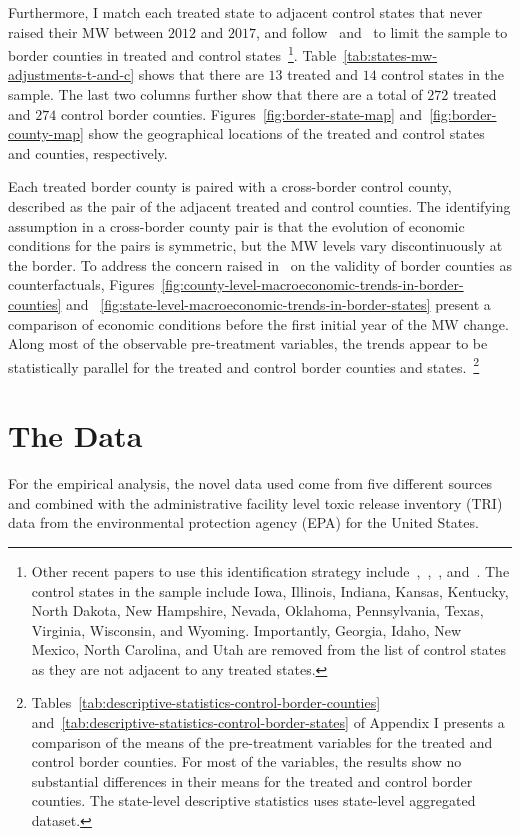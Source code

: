 \documentclass[12pt, english]{article}
\begin{document}
    Furthermore, I match each treated state to adjacent control states that never raised their MW between $2012$ and $2017$, and follow~\cite{dube2010minimum} and~\cite{gopalan2021state} to limit the sample to border counties in treated and control states~\footnote{\tiny Other recent papers to use this identification strategy include~\cite{aaronson2018industry},~\cite{dube2019fairness},~\cite{jardim2018minimum}, and~\cite{zhang2019distributional}. The control states in the sample include Iowa, Illinois, Indiana, Kansas, Kentucky, North Dakota, New Hampshire, Nevada, Oklahoma, Pennsylvania, Texas, Virginia, Wisconsin, and Wyoming. Importantly, Georgia, Idaho, New Mexico, North Carolina, and Utah are removed from the list of control states as they are not adjacent to any treated states.}. Table~\ref{tab:states-mw-adjustments-t-and-c} shows that there are $13$ treated and $14$ control states in the sample. The last two columns further show that there are a total of $272$ treated and $274$ control border counties. Figures~\ref{fig:border-state-map} and~\ref{fig:border-county-map} show the geographical locations of the treated and control states and counties, respectively.
    
    
    Each treated border county is paired with a cross-border control county, described as the pair of the adjacent treated and control counties. The identifying assumption in a cross-border county pair is that the evolution of economic conditions for the pairs is symmetric, but the MW levels vary discontinuously at the border. To address the concern raised in~\cite{neumark2014revisiting} on the validity of border counties as counterfactuals, Figures~\ref{fig:county-level-macroeconomic-trends-in-border-counties} and ~\ref{fig:state-level-macroeconomic-trends-in-border-states} present a comparison of economic conditions before the first initial year of the MW change. Along most of the observable pre-treatment variables, the trends appear to be statistically parallel for the treated and control border counties and states.~\footnote{\tiny Tables~\ref{tab:descriptive-statistics-control-border-counties} and~\ref{tab:descriptive-statistics-control-border-states} of Appendix I presents a comparison of the means of the pre-treatment variables for the treated and control border counties. For most of the variables, the results show no substantial differences in their means for the treated and control border counties. The state-level descriptive statistics uses state-level aggregated dataset.}


    \section{The Data}\label{sec:data}
    For the empirical analysis, the novel data used come from five different sources and combined with the administrative facility level toxic release inventory (TRI) data from the environmental protection agency (EPA) for the United States.
\end{document}
